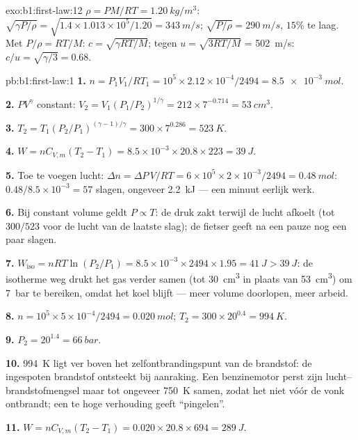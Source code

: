 \begin{solution}{exo:b1:first-law:12}
$\rho = PM/RT = \qty{1.20}{kg/m^3}$: $\sqrt{\gamma P/\rho} = \sqrt{1.4 \times
1.013\times10^5/1.20} = \qty{343}{m/s}$; $\sqrt{P/\rho} = \qty{290}{m/s}$, $15\%$
te laag. Met $P/\rho = RT/M$: $c = \sqrt{\gamma RT/M}$; tegen $u = \sqrt{3RT/M}$
= \qty{502}{m/s}: $c/u = \sqrt{\gamma/3} = 0.68$.
\end{solution}

\begin{solution}{pb:b1:first-law:1}
\textbf{1.} $n = P_1V_1/RT_1 = 10^5 \times 2.12\times10^{-4}/2494 = \qty{8.5e-3}{mol}$.

\textbf{2.} $PV^\gamma$ constant: $V_2 = V_1(P_1/P_2)^{1/\gamma} = 212 \times
7^{-0.714} = \qty{53}{cm^3}$.

\textbf{3.} $T_2 = T_1(P_2/P_1)^{(\gamma - 1)/\gamma} = 300 \times 7^{0.286} =
\qty{523}{K}$.

\textbf{4.} $W = nC_{V,m}(T_2 - T_1) = 8.5\times10^{-3} \times 20.8 \times 223 =
\qty{39}{J}$.

\textbf{5.} Toe te voegen lucht: $\Delta n = \Delta P\,V/RT = 6\times10^5 \times 2\times10^{-3}/
2494 = \qty{0.48}{mol}$: $0.48/8.5\times10^{-3} = 57$ slagen, ongeveer
\qty{2.2}{kJ} --- een minuut eerlijk werk.

\textbf{6.} Bij constant volume geldt $P \propto T$: de druk zakt terwijl de lucht
afkoelt (tot $300/523$ voor de lucht van de laatste slag); de fietser geeft na
een pauze nog een paar slagen.

\textbf{7.} $W_{\text{iso}} = nRT\ln(P_2/P_1) = 8.5\times10^{-3} \times 2494 \times
1.95 = \qty{41}{J} > \qty{39}{J}$: de isotherme weg drukt het gas verder
samen (tot \qty{30}{cm^3} in plaats van \qty{53}{cm^3}) om \qty{7}{bar} te bereiken,
omdat het koel blijft --- meer volume doorlopen, meer arbeid.

\textbf{8.} $n = 10^5 \times 5\times10^{-4}/2494 = \qty{0.020}{mol}$; $T_2 =
300 \times 20^{0.4} = \qty{994}{K}$.

\textbf{9.} $P_2 = 20^{1.4} = \qty{66}{bar}$.

\textbf{10.} \qty{994}{K} ligt ver boven het zelfontbrandingspunt van de brandstof: de
ingespoten brandstof ontsteekt bij aanraking. Een benzinemotor perst zijn
lucht--brandstofmengsel maar tot ongeveer \qty{750}{K} samen, zodat het niet
vóór de vonk ontbrandt; een te hoge verhouding geeft ``pingelen''.

\textbf{11.} $W = nC_{V,m}(T_2 - T_1) = 0.020 \times 20.8 \times 694 = \qty{289}{J}$.


\end{solution}

